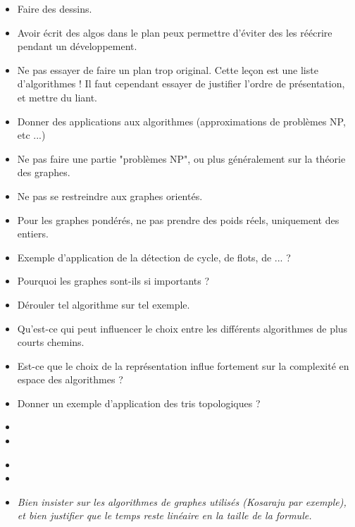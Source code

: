\documentclass{agregfiche}
\begin{document}
\secpieges

\begin{itemize}
    \item Faire des dessins.
    \item Avoir écrit des algos dans le plan peux permettre d'éviter des les réécrire pendant un développement.
    \item Ne pas essayer de faire un plan trop original. Cette leçon est une liste d'algorithmes ! Il faut cependant essayer de justifier l'ordre de présentation, et mettre du liant.
    \item Donner des applications aux algorithmes (approximations de problèmes NP, etc ...)
    \item Ne pas faire une partie "problèmes NP", ou plus généralement sur la théorie des graphes.
    \item Ne pas se restreindre aux graphes orientés.
    \item Pour les graphes pondérés, ne pas prendre des poids réels, uniquement des entiers.
\end{itemize}

\secquestionsclassiques

\begin{itemize}
    \item Exemple d'application de la détection de cycle, de flots, de ... ?
    \item Pourquoi les graphes sont-ils si importants ?
    \item Dérouler tel algorithme sur tel exemple.
    \item Qu'est-ce qui peut influencer le choix entre les différents algorithmes de plus courts chemins.
    \item Est-ce que le choix de la représentation influe fortement sur la complexité en espace des algorithmes ?
    \item Donner un exemple d'application des tris topologiques ?
\end{itemize}

\secreferences

\begin{itemize}
    \item 
    \item 
\end{itemize}

\secdev

\begin{itemize}
	\item 
	\item 
        \item 
          \textit{Bien insister sur les algorithmes de graphes utilisés (Kosaraju par exemple), et bien justifier que le temps reste linéaire en la taille de la formule.}
\end{itemize}
\end{document}
